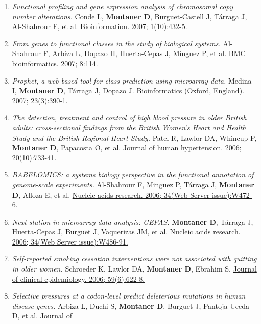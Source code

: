 \begin{enumerate}
{  2007; 8:185.}
\item
  \emph{Functional profiling and gene expression analysis of chromosomal
  copy number alterations.} Conde L, \textbf{Montaner D},
  Burguet-Castell J, Tárraga J, Al-Shahrour F, et al.
  \href{http://www.ncbi.nlm.nih.gov//pubmed/17597935}{Bioinformation.
  2007; 1(10):432-5.}
\item
  \emph{From genes to functional classes in the study of biological
  systems.} Al-Shahrour F, Arbiza L, Dopazo H, Huerta-Cepas J, Mínguez
  P, et al. \href{http://www.ncbi.nlm.nih.gov//pubmed/17407596}{BMC
  bioinformatics. 2007; 8:114.}
\item
  \emph{Prophet, a web-based tool for class prediction using microarray
  data.} Medina I, \textbf{Montaner D}, Tárraga J, Dopazo J.
  \href{http://www.ncbi.nlm.nih.gov//pubmed/17138587}{Bioinformatics
  (Oxford, England). 2007; 23(3):390-1.}
\item
  \emph{The detection, treatment and control of high blood pressure in
  older British adults: cross-sectional findings from the British
  Women's Heart and Health Study and the British Regional Heart Study.}
  Patel R, Lawlor DA, Whincup P, \textbf{Montaner D}, Papacosta O, et
  al. \href{http://www.ncbi.nlm.nih.gov//pubmed/16855626}{Journal of
  human hypertension. 2006; 20(10):733-41.}
\item
  \emph{BABELOMICS: a systems biology perspective in the functional
  annotation of genome-scale experiments.} Al-Shahrour F, Minguez P,
  Tárraga J, \textbf{Montaner D}, Alloza E, et al.
  \href{http://www.ncbi.nlm.nih.gov//pubmed/16845052}{Nucleic acids
  research. 2006; 34(Web Server issue):W472-6.}
\item
  \emph{Next station in microarray data analysis: GEPAS.}
  \textbf{Montaner D}, Tárraga J, Huerta-Cepas J, Burguet J, Vaquerizas
  JM, et al. \href{http://www.ncbi.nlm.nih.gov//pubmed/16845056}{Nucleic
  acids research. 2006; 34(Web Server issue):W486-91.}
\item
  \emph{Self-reported smoking cessation interventions were not
  associated with quitting in older women.} Schroeder K, Lawlor DA,
  \textbf{Montaner D}, Ebrahim S.
  \href{http://www.ncbi.nlm.nih.gov//pubmed/16713525}{Journal of
  clinical epidemiology. 2006; 59(6):622-8.}
\item
  \emph{Selective pressures at a codon-level predict deleterious
  mutations in human disease genes.} Arbiza L, Duchi S, \textbf{Montaner
  D}, Burguet J, Pantoja-Uceda D, et al.
  \href{http://www.ncbi.nlm.nih.gov//pubmed/16584746}{Journal of
}
\end{enumerate}
